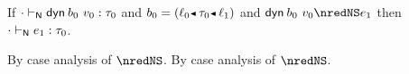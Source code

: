 \begin{lemma}\label{H-dyn-type-preservation}\leavevmode
  If\/ $\snil \sWTN \edynb{\sbnd_0}{\svalue_0} : \stype_0$
  and\/ $\sbnd_0 \eeq \obnd{\sowner_0}{\stype_0}{\sowner_1}$
  and\/ $\edynb{\sbnd_0}{\svalue_0} \nredNS \sexpr_1$
  then\/ $\snil \sWTN \sexpr_1 : \stype_0$.
\end{lemma}{
  \newcommand{\shortproof}{By case analysis of $\nredNS$.}
\begin{lamportproof*}
  \shortproof
\mainproof
  \shortproof

    \begin{pfproof}
      \qedstep
        \begin{pfproof}
          \begin{mathpar}
          \end{mathpar}
        \end{pfproof}
    \end{pfproof}

    \begin{pfproof}
      \qedstep
        \begin{pfproof}
          \begin{mathpar}
          \end{mathpar}
        \end{pfproof}
    \end{pfproof}


\end{lamportproof*}}
